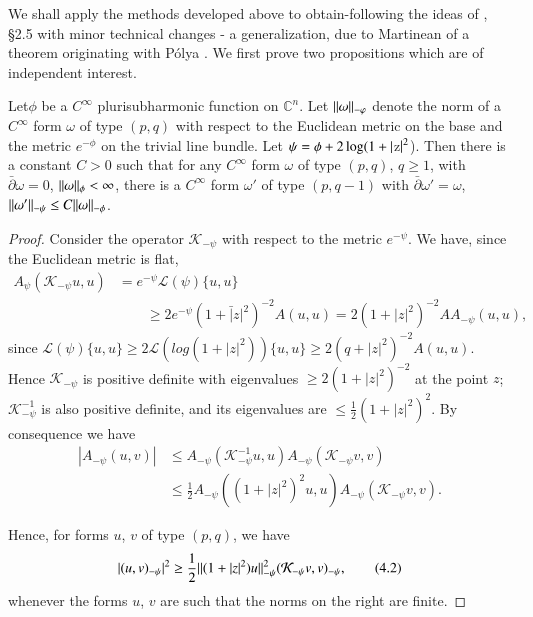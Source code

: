  We shall apply the methods developed above to obtain-following the
 ideas of  \cite{key16}, \S 2.5  with minor technical changes - a
 generalization, due to Martinean \cite{key23} of a theorem
 originating with P\'olya \cite{key27}. We first prove two
 propositions which are of independent interest. 

\begin{prop}\label{chap4:prop4.1}%
  Let\pageoriginale $\phi$ be a $C^\infty$ plurisubharmonic function
  on  $\mathbb{C}^n$. Let $\Arrowvert \omega \Arrowvert_{-\varphi}$
  denote the norm of 
  a $C^\infty$ form $\omega$ of type $(p,q)$ with respect to the
  Euclidean metric on the base and the metric $e^{-\phi}$ on the trivial
  line bundle. Let 
  $\psi = \phi +2 \log (1+\arrowvert$z$\arrowvert^2$). Then there is
  a constant $C > 0$ such that for any $C^\infty$ form $\omega$ of
  type $(p,q)$, $q \geq 1$, with $\bar{\partial}\omega =0$, $\Arrowvert
  \omega \Arrowvert_\phi < \infty$, there is a $C^\infty$ form $\omega'$ of
  type $(p,q - 1)$ with $\bar{\partial}\omega' =\omega$, $\Arrowvert
  \omega' \Arrowvert_{-\psi} \leq  C\Arrowvert \omega  \Arrowvert_{-\phi}$.  
\end{prop}

\begin{proof}
  Consider the operator $\mathcal{K}_{-\psi}$ with respect to the metric
  $e^{-\psi}$.  We have, since the Euclidean metric is flat,  
  \begin{align*}
     A_\psi(\mathcal{K}_{-\psi} u,u) & = e^{-\psi}
    \mathscr{L}(\psi) \{ u,u \} \\ 
    & \qquad \geq 2 e^{-\psi}(1+\bar{|} z |^2)^{-2} A(u,u) =
    2(1+|z|^2)^{-2} A A_{-\psi} (u,u) , 
  \end{align*}	
  since $\mathscr{L}(\psi) \{ u,u \} \geq 2 \mathscr{L} (log(1+|z|^2))
  \{ u,u \} \geq 2(q+|z|^2)^{-2}A(u,u)$. Hence $\mathcal{K}_{-\psi}$ is
    positive definite with eigenvalues $\geq 2(1+|z|^2)^{-2}$ at the
    point $z$; $\mathcal{K}^{-1}_{-\psi}$ is also positive definite, and
    its eigenvalues are $\leq \frac{1}{2}(1+|z|^2)^2$. By consequence
    we have 	 
    \begin{align*}
	 |A_{-\psi} (u,v)| &\leq A_{-\psi} (\mathcal{K}^{-1}_{-\psi} u,u)
         A_{-\psi}(\mathcal{K}_{-\psi} v,v)\\  
	 &\leq \frac{1}{2}A_{-\psi}((1+|z|^2)^2 u,u) A_{-\psi}
         (\mathcal{K}_{-\psi}v,v).
    \end{align*}
	  
    Hence, for forms $u$, $v$ of type $(p,q)$, we have    
    \begin{equation*}
      |(u,v)_{-\psi} |^2 \geq \frac{1}{2} \Arrowvert(1+|z|^2)u
      \Arrowvert^2_{-\psi}(\mathcal{K}_{-\psi} v,v)_{-\psi},  \tag{4.2}\label{eq4.2}
    \end{equation*}	
    whenever the forms $u$, $v$ are such that the norms on the right
    are finite. 	 
\end{proof}

